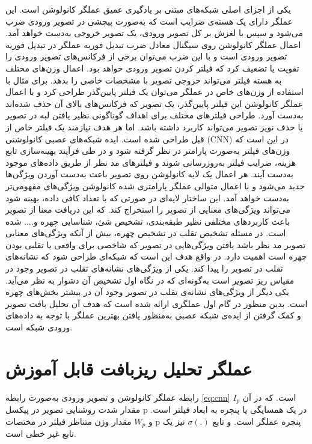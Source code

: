 یکی از اجزای اصلی شبکه‌های مبتنی بر یادگیری عمیق عملگر کانولوشن است. این عملگر دارای یک هسته‌ی ضرایب است که به‌صورت پیچشی در تصویر ورودی ضرب می‌شود و سپس با لغزش بر کل تصویر ورودی، یک تصویر خروجی به‌دست خواهد آمد. 
اعمال عملگر کانولوشن روی سیگنال معادل ضرب تبدیل فوریه عملگر در تبدیل فوریه تصویر ورودی است و با این ضرب می‌توان برخی از فرکانس‌های تصویر ورودی را تقویت یا تضعیف کرد که فیلتر کردن تصویر ورودی خواهد بود. اعمال وزن‌های مختلف به هسته فیلتر می‌تواند خروجی تصویر با مشخصات خاصی را بدهد.
برای مثال با استفاده از وزن‌های خاص در عملگر می‌توان یک فیلتر پایین‌گذر طراحی کرد و با اعمال عملگر کانولوشن این فیلتر پایین‌گذر، یک تصویر که فرکانس‌های بالای آن حذف شده‌اند به‌دست آورد. طراحی فیلترهای مختلف برای اهداف گوناگونی نظیر یافتن لبه در تصویر یا حذف نویز تصویر می‌تواند کاربرد داشته باشد. اما هر هدف نیازمند یک فیلتر خاص از قبل طراحی شده است. 
ایده شبکه‌های عصبی کانولوشنی (CNN) در این است که وزن‌های فیلتر به‌صورت پارامتر در نظر گرفته شود و در طی فرآیند بهینه‌سازی تابع هزینه، ضرایب فیلتر به‌روزرسانی شوند و فیلترهای مد نظر از طریق داده‌های موجود به‌دست آیند. 
هر اعمال یک لایه کانولوشن روی تصویر باعث به‌دست آوردن ویژگی‌ها جدید می‌شود و با اعمال متوالی عملگر پارامتری شده کانولوشن ویژگی‌های مفهومی‌تر به‌دست خواهد آمد. این ساختار لایه‌ای در صورتی که با تعداد کافی داده، بهینه شود می‌تواند ویژگی‌های معنایی از تصویر را استخراج کند. که این دریافت معنا از تصویر باعث کاربردهای مختلفی نظیر طبقه‌بندی، تشخیص شئ، شناسایی چهره و.... شده است.
در مسئله تشخیص تقلب در تشخیص چهره، بیش از آنکه ویژگی‌های معنایی تصویر مد نظر باشد یافتن ویژگی‌هایی در تصویر که شاخصی برای واقعی یا تقلبی بودن چهره است اهمیت دارد. در واقع هدف این است که شبکه‌ای طراحی شود که نشانه‌های تقلب در تصویر را پیدا کند. یکی از ویژگی‌های نشانه‌های تقلب در تصویر وجود در مقیاس ریز تصویر است به‌گونه‌ای که در نگاه اول تشخیص آن دشوار به نظر می‌آید. یکی دیگر از ویژگی‌های نشانه‌ی تقلب در تصویر وجود آن در بیشتر بخش‌های چهره است. بدین منظور در گام اول عملگری ارائه شده است که هدف آن تحلیل بافت تصویر و کمک گرفتن از ایده‌ی شبکه عصبی به‌منظور یافتن بهترین عملگر با توجه به داده‌های ورودی شبکه است.

\section{عملگر تحلیل ریزبافت قابل آموزش}
رابطه عملگر کانولوشن و تصویر ورودی به‌صورت رابطه 
\ref{eq:cnn}
است. که در آن 
$I_p$
مقدار شدت روشنایی تصویر در پیکسل p در یک همسایگی یا پنچره به ابعاد فیلتر است. و 
 $W_p$
مقدار وزن متناظر فیلتر در مختصات p پنجره عملگر است. و تابع
$\sigma(.)$  
نیز یک تابع غیر خطی است.

